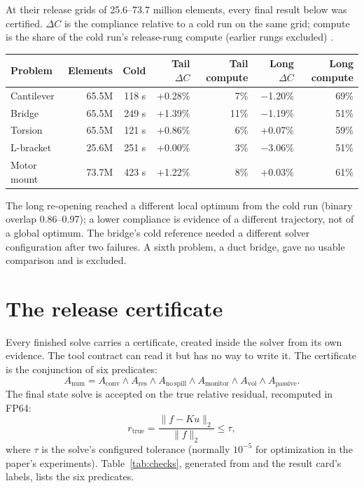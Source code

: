 \begin{evidencebox}
At their release grids of 25.6--73.7 million elements, every final result below was certified. $\Delta C$ is the
compliance relative to a cold run on the same grid; compute is the share of the cold run's release-rung compute
(earlier rungs excluded) .

\smallskip
{\centering\sffamily\footnotesize
\begin{tabular}{@{}lrrrrrr@{}}
\toprule
Problem & Elements & Cold & Tail $\Delta C$ & Tail compute & Long $\Delta C$ & Long compute \\ \midrule
Cantilever & 65.5M & 118 s & +0.28\% & 7\% & $-$1.20\% & 69\% \\
Bridge & 65.5M & 249 s & +1.39\% & 11\% & $-$1.19\% & 51\% \\
Torsion & 65.5M & 121 s & +0.86\% & 6\% & +0.07\% & 59\% \\
L-bracket & 25.6M & 251 s & +0.00\% & 3\% & $-$3.06\% & 51\% \\
Motor mount & 73.7M & 423 s & +1.22\% & 8\% & +0.03\% & 61\% \\
\bottomrule
\end{tabular}\par}

\smallskip
The long re-opening reached a different local optimum from the cold run (binary overlap 0.86--0.97); a lower compliance
is evidence of a different trajectory, not of a global optimum. The bridge's cold reference needed a different solver
configuration after two failures. A sixth problem, a duct bridge, gave no usable comparison and is excluded.
\end{evidencebox}

\section{The release certificate}\label{sec:certificate}
Every finished solve carries a certificate, created inside the solver from its own evidence. The tool contract can read
it but has no way to write it. The certificate is the conjunction of six predicates:
\begin{equation}
  A_\mathrm{num} = A_\mathrm{conv}\land A_\mathrm{res}\land A_\mathrm{no\,spill}\land A_\mathrm{monitor}\land
  A_\mathrm{vol}\land A_\mathrm{passive}.
\end{equation}
The final state solve is accepted on the true relative residual, recomputed in FP64:
\begin{equation}
  r_\mathrm{true} = \frac{\lVert f - K u\rVert_2}{\lVert f\rVert_2} \le \tau ,
\end{equation}
where $\tau$ is the solve's configured tolerance (normally $10^{-5}$ for optimization in the paper's experiments).
Table~\ref{tab:checks}, generated from  and the result card's labels, lists the six predicates.

